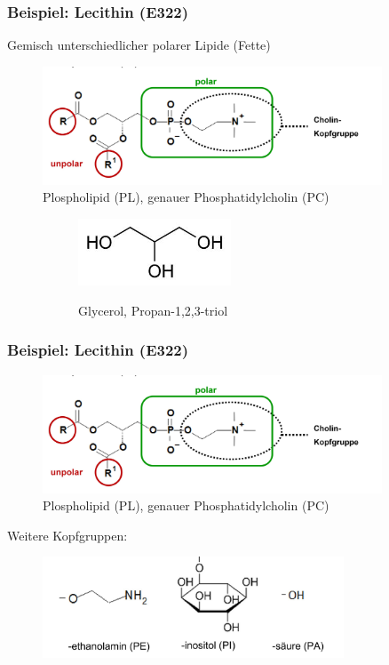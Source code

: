 \documentclass{beamer} %
\begin{document}
\begin{frame}
\frametitle{Beispiel: Lecithin (E322)}
\begin{block}{}
Gemisch unterschiedlicher polarer Lipide (Fette)
\end{block}
\begin{figure}
\centering
\includegraphics[width = 0.9\textwidth]{Lecithin.JPG}
\caption{Plospholipid (PL), genauer Phosphatidylcholin (PC) }
\end{figure}
\pause
\begin{figure}[H]
\centering
\begin{subfigure}[c]{0.5\textwidth}
\centering
\includegraphics[width = 0.5\textwidth]{glycerol.jpg}
\end{subfigure}
\begin{subfigure}[c]{0.45\textwidth}
\centering
Glycerol, Propan-1,2,3-triol
\end{subfigure}
\end{figure}
\end{frame}

\begin{frame}
\frametitle{Beispiel: Lecithin (E322)}
\begin{figure}
\centering
\includegraphics[width = 0.9\textwidth]{Lecithin.JPG}
\caption{Plospholipid (PL), genauer Phosphatidylcholin (PC) }
\end{figure}
Weitere Kopfgruppen:
\begin{figure}[h]
\centering
\includegraphics[width = 0.8\textwidth]{Kopfgruppen.JPG}
\end{figure}
\end{frame}
\end{document}
